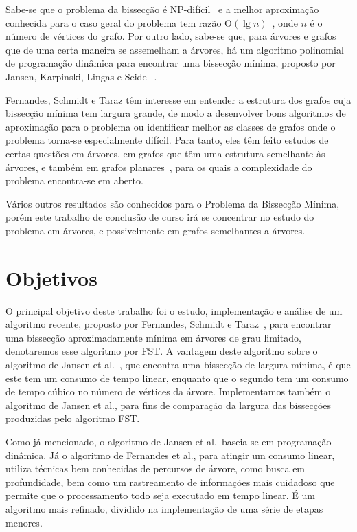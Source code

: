 \documentclass[a4paper,12pt]{article}
\newcommand{\Oh}{\mathrm{O}}
\begin{document}
Sabe-se que o problema da bissecção é NP-difícil~\cite{GareyJS76} 
e a melhor aproximação conhecida para o caso geral do problema tem 
razão $\Oh(\lg n)$~\cite{Racke08}, onde $n$ é o número de vértices 
do grafo. 
Por outro lado, sabe-se que, para árvores e grafos que de uma 
certa maneira se assemelham a árvores, há um algoritmo polinomial 
de programação dinâmica para encontrar uma bissecção mínima, 
proposto por Jansen, Karpinski, Lingas e 
Seidel~\cite{JansenKLS01}. 

Fernandes, Schmidt e Taraz têm interesse em entender a estrutura 
dos grafos cuja bissecção mínima tem largura grande, de modo a 
desenvolver bons algoritmos de aproximação para o problema ou 
identificar melhor as classes de grafos onde o problema torna-se 
especialmente difícil. 
Para tanto, eles têm feito estudos de certas questões em árvores, 
em grafos que têm uma estrutura semelhante às árvores, e também em 
grafos planares~\cite{FernandesST13,FernandesST15}, para os quais 
a complexidade do problema encontra-se em aberto. 

Vários outros resultados são conhecidos para o Problema da 
Bissecção Mínima, porém este trabalho de conclusão de curso irá se 
concentrar no estudo do problema em árvores, e possivelmente em 
grafos semelhantes a árvores.

\newpage



\section{Objetivos} 

O principal objetivo deste trabalho foi o estudo, implementação e 
análise de um algoritmo recente, proposto por Fernandes, Schmidt e 
Taraz~\cite{FernandesST13}, para encontrar uma bissecção 
aproximadamente mínima em árvores de grau limitado, denotaremos
esse algoritmo por FST. 
A vantagem deste algoritmo sobre o algoritmo de Jansen et 
al.~\cite{JansenKLS01}, que encontra uma bissecção de largura 
mínima, é que este tem um consumo de tempo linear, enquanto que o 
segundo tem um consumo de tempo cúbico no número de vértices da 
árvore. 
Implementamos também o algoritmo de Jansen et al., para fins de 
comparação da largura das bissecções produzidas pelo algoritmo
FST. 

Como já mencionado, o algoritmo de Jansen et al.\ baseia-se em 
programação dinâmica. 
Já o algoritmo de Fernandes et al., para atingir um consumo 
linear, utiliza técnicas bem conhecidas de percursos de árvore, 
como busca em profundidade, bem como um rastreamento de 
informações mais cuidadoso que permite que o processamento todo 
seja executado em tempo linear. 
É um algoritmo mais refinado, dividido na implementação de uma 
série de etapas menores. 
\end{document}
